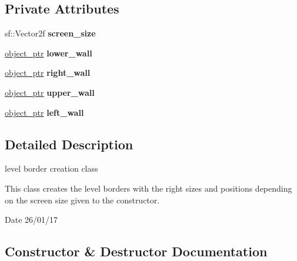 \subsection*{Private Attributes}
\begin{DoxyCompactItemize}
\item 
\mbox{\label{classbase__level_a69702ca202fa2a3a4c83faaa807971c2}} 
sf\+::\+Vector2f {\bfseries screen\+\_\+size}
\item 
\mbox{\label{classbase__level_a196474637fdc953f4f2ed088ace891f7}} 
\hyperlink{drawable_8hpp_aab5add95f06d2ba25dbfed8eb07274fa}{object\+\_\+ptr} {\bfseries lower\+\_\+wall}
\item 
\mbox{\label{classbase__level_a4a1f6a57a83aec4bd0b82072ab21df43}} 
\hyperlink{drawable_8hpp_aab5add95f06d2ba25dbfed8eb07274fa}{object\+\_\+ptr} {\bfseries right\+\_\+wall}
\item 
\mbox{\label{classbase__level_a5e4ab9bce71cb388025305d0f20cb7bf}} 
\hyperlink{drawable_8hpp_aab5add95f06d2ba25dbfed8eb07274fa}{object\+\_\+ptr} {\bfseries upper\+\_\+wall}
\item 
\mbox{\label{classbase__level_a29e885695d2a043bdab849dcb73c5c8e}} 
\hyperlink{drawable_8hpp_aab5add95f06d2ba25dbfed8eb07274fa}{object\+\_\+ptr} {\bfseries left\+\_\+wall}
\end{DoxyCompactItemize}


\subsection{Detailed Description}
level border creation class 

This class creates the level borders with the right sizes and positions depending on the screen size given to the constructor.

\begin{DoxyDate}{Date}
26/01/17 
\end{DoxyDate}


\subsection{Constructor \& Destructor Documentation}
\mbox{\label{classbase__level_addf165fdc5f4e953be3b6a2dcd00459b}} 
